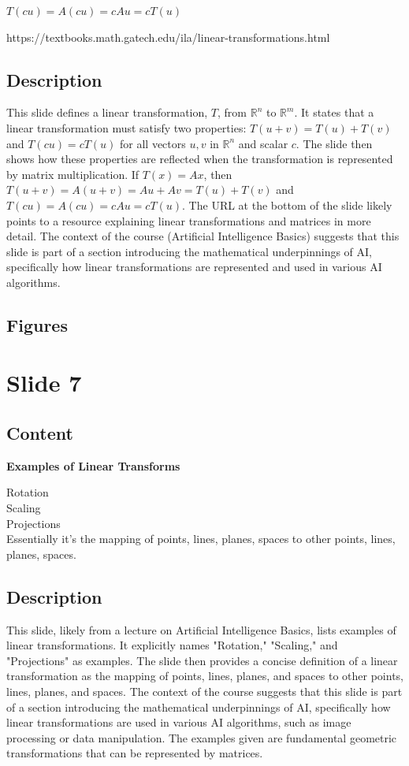 \documentclass{article}%
\begin{document}
$T(cu) = A(cu) = cAu = cT(u)$

https://textbooks.math.gatech.edu/ila/linear-transformations.html
%
\subsection{Description}%
This slide defines a linear transformation, $T$, from $\mathbb{R}^n$ to $\mathbb{R}^m$.  It states that a linear transformation must satisfy two properties:  $T(u + v) = T(u) + T(v)$ and $T(cu) = cT(u)$ for all vectors $u, v$ in $\mathbb{R}^n$ and scalar $c$.  The slide then shows how these properties are reflected when the transformation is represented by matrix multiplication.  If $T(x) = Ax$, then $T(u + v) = A(u + v) = Au + Av = T(u) + T(v)$ and $T(cu) = A(cu) = cAu = cT(u)$.  The URL at the bottom of the slide likely points to a resource explaining linear transformations and matrices in more detail.  The context of the course (Artificial Intelligence Basics) suggests that this slide is part of a section introducing the mathematical underpinnings of AI, specifically how linear transformations are represented and used in various AI algorithms.%
\subsection{Figures}%
\begin{figure}[H]%
\centering%
\end{figure}

%
\newpage%
\section{Slide 7}%
\label{sec:Slide7}%
\subsection{Content}%

\textbf{Examples of Linear Transforms}

Rotation \\
Scaling \\
Projections \\
Essentially it's the mapping of points, lines, planes, spaces to other points, lines, planes, spaces.
%
\subsection{Description}%
This slide, likely from a lecture on Artificial Intelligence Basics, lists examples of linear transformations.  It explicitly names "Rotation," "Scaling," and "Projections" as examples.  The slide then provides a concise definition of a linear transformation as the mapping of points, lines, planes, and spaces to other points, lines, planes, and spaces.  The context of the course suggests that this slide is part of a section introducing the mathematical underpinnings of AI, specifically how linear transformations are used in various AI algorithms, such as image processing or data manipulation.  The examples given are fundamental geometric transformations that can be represented by matrices.%
\end{document}
